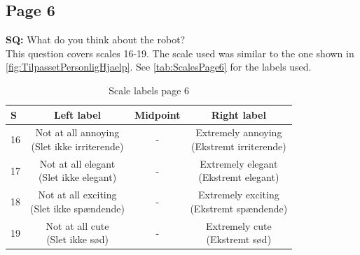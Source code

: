 \subsection{Page 6}
\noindent
\textbf{SQ:} What do you think about the robot?\\%
This question covers scales 16-19. The scale used was similar to the one shown in \autoref{fig:TilpassetPersonligHjaelp}. See \autoref{tab:ScalesPage6} for the labels used.
%
\begin{table}[H]
	\centering
\caption{Scale labels page 6}
	\label{tab:ScalesPage6} 
	\begin{tabular}{l|c|c|c}
		S     & Left label & Midpoint & Right label \\\hline
		16   & \makecell{Not at all annoying\\(Slet ikke irriterende)}  & - & \makecell{Extremely annoying \\(Ekstremt irriterende)}        \\\hline
		17   & \makecell{Not at all elegant \\(Slet ikke elegant)} & - & \makecell{Extremely elegant \\(Ekstremt elegant)}         \\\hline
		18   & \makecell{Not at all exciting\\(Slet ikke spændende)} & - & \makecell{Extremely exciting \\(Ekstremt spændende)}         \\\hline
	 	19   & \makecell{Not at all cute\\(Slet ikke sød)} & - & \makecell{Extremely cute \\(Ekstremt sød)}               
	\end{tabular}        
\end{table}
\noindent
%
